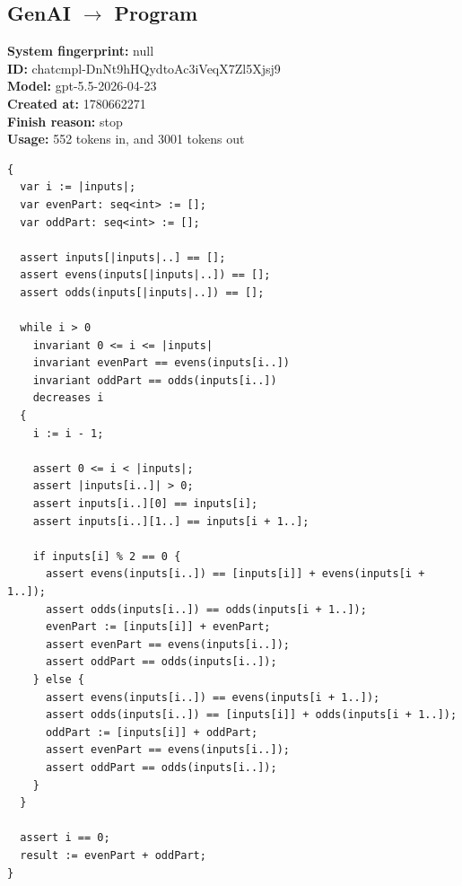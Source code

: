 \documentclass{article}
\begin{document}
\subsection*{GenAI $\rightarrow$ Program}
\textbf{System fingerprint: }null
\\\textbf{ID: }chatcmpl-DnNt9hHQydtoAc3iVeqX7Zl5Xjsj9
\\\textbf{Model: }gpt-5.5-2026-04-23
\\\textbf{Created at: }1780662271
\\\textbf{Finish reason: }stop
\\\textbf{Usage: }552 tokens in, and 3001 tokens out
\begin{lstlisting}
{
  var i := |inputs|;
  var evenPart: seq<int> := [];
  var oddPart: seq<int> := [];

  assert inputs[|inputs|..] == [];
  assert evens(inputs[|inputs|..]) == [];
  assert odds(inputs[|inputs|..]) == [];

  while i > 0
    invariant 0 <= i <= |inputs|
    invariant evenPart == evens(inputs[i..])
    invariant oddPart == odds(inputs[i..])
    decreases i
  {
    i := i - 1;

    assert 0 <= i < |inputs|;
    assert |inputs[i..]| > 0;
    assert inputs[i..][0] == inputs[i];
    assert inputs[i..][1..] == inputs[i + 1..];

    if inputs[i] % 2 == 0 {
      assert evens(inputs[i..]) == [inputs[i]] + evens(inputs[i + 1..]);
      assert odds(inputs[i..]) == odds(inputs[i + 1..]);
      evenPart := [inputs[i]] + evenPart;
      assert evenPart == evens(inputs[i..]);
      assert oddPart == odds(inputs[i..]);
    } else {
      assert evens(inputs[i..]) == evens(inputs[i + 1..]);
      assert odds(inputs[i..]) == [inputs[i]] + odds(inputs[i + 1..]);
      oddPart := [inputs[i]] + oddPart;
      assert evenPart == evens(inputs[i..]);
      assert oddPart == odds(inputs[i..]);
    }
  }

  assert i == 0;
  result := evenPart + oddPart;
}
\end{lstlisting}
\end{document}

